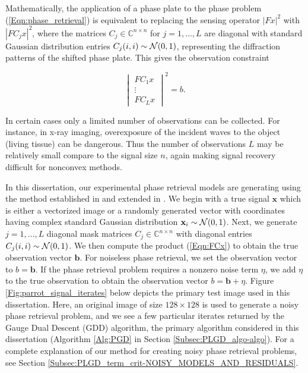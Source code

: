 Mathematically, the application of a phase plate to the phase problem (\ref{Eqn:phase_retrieval}) is equivalent to replacing the sensing operator $|Fx|^2$ with $|FC_jx|^2$, where the matrices $C_j \in \mathbb{C}^{n \times n}$ for $j = 1, \ldots, L$ are diagonal with standard Gaussian distribution entries $C_j(i,i) \sim {\mathcal N}(0, 1)$, representing the diffraction patterns of the shifted phase plate.  This gives the observation constraint

\begin{equation}		\label{Eqn:FCx}
	\begin{vmatrix}
		FC_1x \\ \vdots \\ FC_Lx
	\end{vmatrix}^2
	= b.
\end{equation}

In certain cases only a limited number of observations can be collected.  For instance, in x-ray imaging, overexposure of the incident waves to the object (living tissue) can be dangerous.  Thus the number of observations $L$ may be relatively small compare to the signal size $n$, again making signal recovery difficult for nonconvex methods.





In this dissertation, our experimental phase retrieval models are generating using the method established in \cite{DBLP:journals/tit/CandesLS15} and extended in \cite{DBLP:journals/siamsc/FriedlanderM16}.  
We begin with a true signal $\mathbf{x}$ which is either a vectorized image or a randomly generated vector with coordinates having complex standard Gaussian distribution $\mathbf{x}_i \sim {\mathcal N}(0, 1)$.
Next, we generate $j = 1, \ldots,  L$ diagonal mask matrices $C_j \in \mathbb{C}^{n \times n}$ with diagonal entries $C_j(i,i) \sim {\mathcal N}(0, 1)$.
We then compute the product (\ref{Eqn:FCx}) to obtain the true observation vector $\mathbf{b}$.
For noiseless phase retrieval, we set the observation vector to $b = \mathbf{b}$.
If the phase retrieval problem requires a nonzero noise term $\eta$, we add $\eta$ to the true observation to obtain the observation vector $b = \mathbf{b} + \eta$.
Figure \ref{Fig:parrot_signal_iterates} below depicts the primary test image used in this dissertation.
Here, an original image of size $128 \times 128$ is used to generate a noisy phase retrieval problem, and we see a few particular iterates returned by the Gauge Dual Descent (GDD) algorithm, the primary algorithm considered in this dissertation (Algorithm \ref{Alg:PGD} in Section \ref{Subsec:PLGD_algo-algo}).  
For a complete explanation of our method for creating noisy phase retrieval problems, see Section \ref{Subsec:PLGD_term_crit-NOISY_MODELS_AND_RESIDUALS}.

